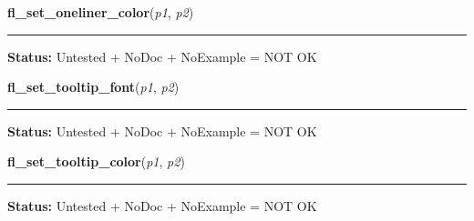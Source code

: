     \label{xformslib:library:fl_set_oneliner_color}

    \vspace{0.5ex}

\hspace{.8\funcindent}\begin{boxedminipage}{\funcwidth}

    \raggedright \textbf{fl\_set\_oneliner\_color}(\textit{p1}, \textit{p2})

    \vspace{-1.5ex}

    \rule{\textwidth}{0.5\fboxrule}
\setlength{\parskip}{2ex}
\setlength{\parskip}{1ex}
\textbf{Status:} Untested + NoDoc + NoExample = NOT OK



    \end{boxedminipage}

    \label{xformslib:library:fl_set_tooltip_font}

    \vspace{0.5ex}

\hspace{.8\funcindent}\begin{boxedminipage}{\funcwidth}

    \raggedright \textbf{fl\_set\_tooltip\_font}(\textit{p1}, \textit{p2})

    \vspace{-1.5ex}

    \rule{\textwidth}{0.5\fboxrule}
\setlength{\parskip}{2ex}
\setlength{\parskip}{1ex}
\textbf{Status:} Untested + NoDoc + NoExample = NOT OK



    \end{boxedminipage}

    \label{xformslib:library:fl_set_tooltip_color}

    \vspace{0.5ex}

\hspace{.8\funcindent}\begin{boxedminipage}{\funcwidth}

    \raggedright \textbf{fl\_set\_tooltip\_color}(\textit{p1}, \textit{p2})

    \vspace{-1.5ex}

    \rule{\textwidth}{0.5\fboxrule}
\setlength{\parskip}{2ex}
\setlength{\parskip}{1ex}
\textbf{Status:} Untested + NoDoc + NoExample = NOT OK



    \end{boxedminipage}

